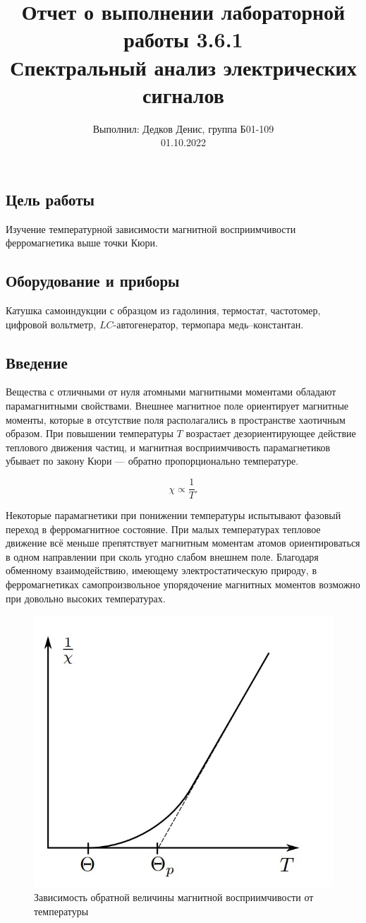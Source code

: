 \documentclass[12pt,a4paper]{article}
\author{\normalsize Выполнил: Дедков Денис, группа Б01-109 \\
	\normalsize 01.10.2022}
\date{}
\title{
	\large Отчет о выполнении лабораторной работы 3.6.1 \\
	\Large Спектральный анализ электрических сигналов \\ 
	
}
\begin{document}
\maketitle
\subsection*{Цель работы} Изучение температурной зависимости магнитной восприимчивости ферромагнетика выше точки Кюри.
\subsection*{Оборудование и приборы} Катушка самоиндукции с образцом из гадолиния, термостат, частотомер, цифровой вольтметр, $LC$-автогенератор, термопара медь–константан.

\subsection*{Введение}
Вещества с отличными от нуля атомными магнитными моментами
обладают парамагнитными свойствами. Внешнее магнитное поле ориентирует магнитные моменты, которые в отсутствие поля располагались в пространстве хаотичным образом. При повышении температуры $T$ возрастает дезориентирующее действие теплового движения частиц, и магнитная восприимчивость парамагнетиков убывает по закону Кюри — обратно пропорционально температуре.

$$\chi \propto \frac{1}{T}.$$

Некоторые парамагнетики при понижении температуры испытывают фазовый переход в ферромагнитное состояние. При малых температурах тепловое движение всё меньше препятствует магнитным моментам атомов ориентироваться в одном направлении при
сколь угодно слабом внешнем поле. Благодаря обменному взаимодействию, имеющему электростатическую природу, в ферромагнетиках самопроизвольное упорядочение магнитных моментов возможно при довольно высоких температурах.

\begin{figure}[H]
	\centering
	\includegraphics[width=0.5\linewidth]{"res/fig-chi_T.jpg"}
	\caption{Зависимость обратной величины магнитной восприимчивости от температуры}
	\label{fig:chi_T}
\end{figure}
\end{document}
